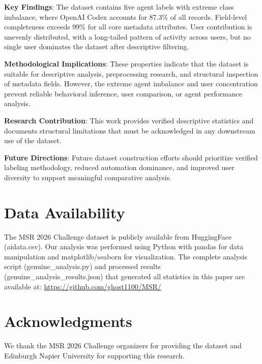 \documentclass[conference]{IEEEtran}
\begin{document}
\textbf{Key Findings}: The dataset contains five agent labels with extreme class imbalance, where OpenAI Codex accounts for 87.3\% of all records. Field-level completeness exceeds 99\% for all core metadata attributes. User contribution is unevenly distributed, with a long-tailed pattern of activity across users, but no single user dominates the dataset after descriptive filtering.

\textbf{Methodological Implications}: These properties indicate that the dataset is suitable for descriptive analysis, preprocessing research, and structural inspection of metadata fields. However, the extreme agent imbalance and user concentration prevent reliable behavioral inference, user comparison, or agent performance analysis.

\textbf{Research Contribution}: This work provides verified descriptive statistics and documents structural limitations that must be acknowledged in any downstream use of the dataset.

\textbf{Future Directions}: Future dataset construction efforts should prioritize verified labeling methodology, reduced automation dominance, and improved user diversity to support meaningful comparative analysis.

\section*{Data Availability}

The MSR 2026 Challenge dataset is publicly available from HuggingFace (aidata.csv). Our analysis was performed using Python with pandas for data manipulation and matplotlib/seaborn for visualization. The complete analysis script (genuine\_analysis.py) and processed results (genuine\_analysis\_results.json) that generated all statistics in this paper are available at: \url{https://github.com/ghost1100/MSR/}

\section*{Acknowledgments}

We thank the MSR 2026 Challenge organizers for providing the dataset and Edinburgh Napier University for supporting this research.
\end{document}
